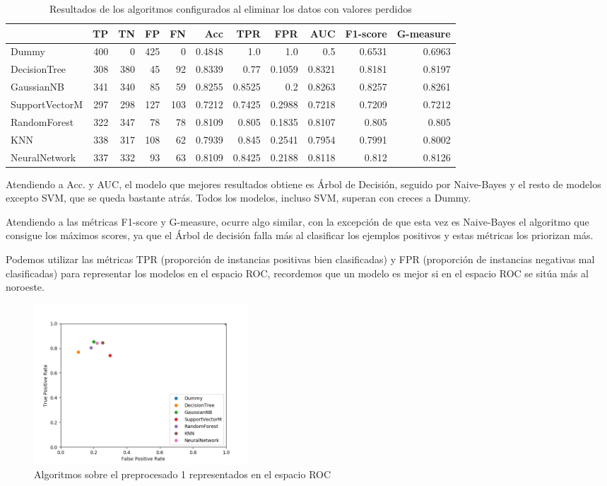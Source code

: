 \documentclass{article}
\begin{document}
\begin{table}[H]
\centering
\caption{Resultados de los algoritmos configurados al eliminar los
  datos con valores perdidos}
\label{tab:res-dropna}
\begin{tabular}{|lrrrrrrrrrr|}
\hline
 & TP & TN & FP & FN & Acc & TPR & FPR & AUC & F1-score & G-measure\\ \hline
Dummy & 400 & 0 & 425 & 0 & 0.4848 & 1.0 & 1.0 & 0.5 & 0.6531 & 0.6963\\
DecisionTree & 308 & 380 & 45 & 92 & 0.8339 & 0.77 & 0.1059 & 0.8321 & 0.8181 & 0.8197\\
GaussianNB & 341 & 340 & 85 & 59 & 0.8255 & 0.8525 & 0.2 & 0.8263 & 0.8257 & 0.8261\\
SupportVectorM & 297 & 298 & 127 & 103 & 0.7212 & 0.7425 & 0.2988 & 0.7218 & 0.7209 & 0.7212\\
RandomForest & 322 & 347 & 78 & 78 & 0.8109 & 0.805 & 0.1835 & 0.8107 & 0.805 & 0.805\\
KNN & 338 & 317 & 108 & 62 & 0.7939 & 0.845 & 0.2541 & 0.7954 & 0.7991 & 0.8002\\
NeuralNetwork & 337 & 332 & 93 & 63 & 0.8109 & 0.8425 & 0.2188 & 0.8118 & 0.812 & 0.8126\\
\hline
\end{tabular}
\end{table}

Atendiendo a Acc. y AUC, el modelo que mejores resultados obtiene es
Árbol de Decisión, seguido por Naive-Bayes y el resto de modelos
excepto SVM, que se queda bastante atrás. Todos los modelos, incluso
SVM, superan con creces a Dummy.

Atendiendo a las métricas F1-score y G-measure, ocurre algo similar,
con la excepción de que esta vez es Naive-Bayes el algoritmo que
consigue los máximos scores, ya que el Árbol de decisión falla más al
clasificar los ejemplos positivos y estas métricas los priorizan más.

Podemos utilizar las métricas TPR (proporción de instancias positivas
bien clasificadas) y FPR (proporción de instancias negativas mal
clasificadas) para representar los modelos en el espacio ROC,
recordemos que un modelo es mejor si en el espacio ROC se sitúa más al
noroeste.

\begin{figure}[H]
  \centering
  \label{fig:roc1}
  \caption{Algoritmos sobre el preprocesado 1 representados en el espacio ROC}
  \includegraphics[width=80mm]{figures/roc1}
\end{figure}
\end{document}
